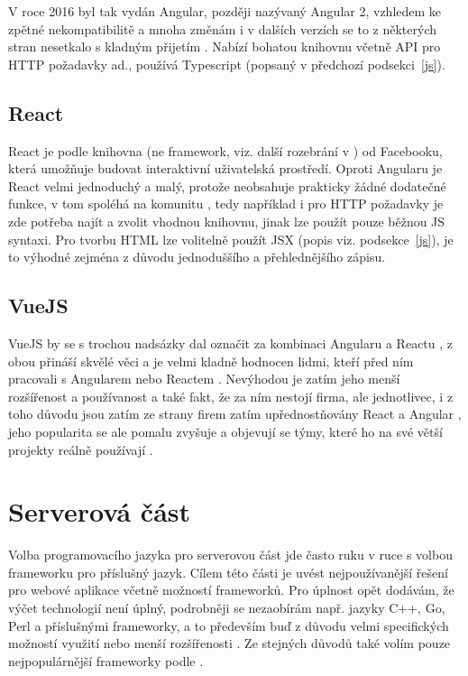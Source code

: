         V roce 2016 byl tak vydán Angular, později nazývaný Angular 2, vzhledem ke zpětné nekompatibilitě a mnoha změnám i v dalších verzích \cite{js-fw2} se to z některých stran nesetkalo s kladným přijetím \cite{angular2,js-fw1}. Nabízí bohatou knihovnu včetně API pro HTTP požadavky ad., používá Typescript (popsaný v předchozí podsekci~\ref{js}).
        
        \subsection{React}\label{react}
        React je podle \cite{react} knihovna (ne framework, viz. další rozebrání v \cite{js-fw1}) od Facebooku, která umožňuje budovat interaktivní uživatelská prostředí. Oproti Angularu je React velmi jednoduchý a malý, protože neobsahuje prakticky žádné dodatečné funkce, v tom spoléhá na komunitu \cite{js-fw1}, tedy například i pro HTTP požadavky je zde potřeba najít a zvolit vhodnou knihovnu, jinak lze použít pouze běžnou JS syntaxi. Pro tvorbu HTML lze volitelně použít JSX (popis viz. podsekce~\ref{js}), je to výhodné zejména z důvodu jednoduššího a přehlednějšího zápisu.
        
        \subsection{VueJS}
        VueJS by se s trochou nadsázky dal označit za kombinaci Angularu a Reactu \cite{js-fw5}, z obou přináší skvělé věci a je velmi kladně hodnocen lidmi, kteří před ním pracovali s Angularem nebo Reactem \cite{js-fw1}. Nevýhodou je zatím jeho menší rozšířenost a používanost \cite{js-fw1} a také fakt, že za ním nestojí firma, ale jednotlivec, i z toho důvodu jsou zatím ze strany firem zatím upřednostňovány React a Angular \cite{js-fw4}, jeho popularita se ale pomalu zvyšuje a objevují se týmy, které ho na své větší projekty reálně používají \cite{js-fw1}.
    
    
    \section{Serverová část}
    Volba programovacího jazyka pro serverovou část jde často ruku v ruce s volbou frameworku pro příslušný jazyk. Cílem této části je uvést nejpoužívanější řešení pro webové aplikace včetně možností frameworků. Pro úplnost opět dodávám, že výčet technologií není úplný, podrobněji se nezaobírám např. jazyky C++, Go, Perl a příslušnými frameworky, a to především buď z důvodu velmi specifických možností využití \cite{technologie-c++} nebo menší rozšířenosti \cite{stack-stats18,jetbrains-stats}. Ze stejných důvodů také volím pouze nejpopulárnější frameworky podle \cite{hot-frameworks}.
    
